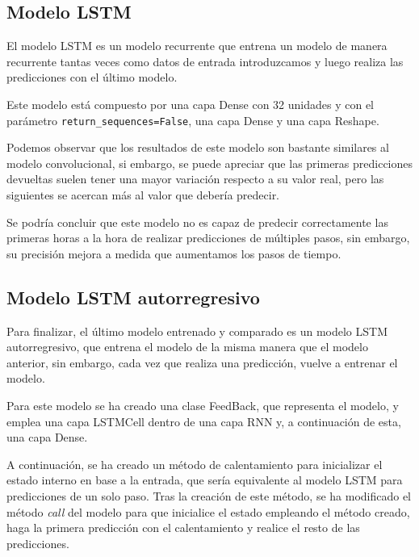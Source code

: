 
\subsection{Modelo LSTM}

El modelo LSTM es un modelo recurrente que entrena un modelo de manera recurrente tantas veces como datos de entrada introduzcamos y luego realiza las predicciones con el último modelo.

\par

Este modelo está compuesto por una capa Dense con 32 unidades y con el parámetro \texttt{return\_sequences=False}, una capa Dense y una capa Reshape.


Podemos observar que los resultados de este modelo son bastante similares al modelo convolucional, si embargo, se puede apreciar que las primeras predicciones devueltas suelen tener una mayor variación respecto a su valor real, pero las siguientes se acercan más al valor que debería predecir.


Se podría concluir que este modelo no es capaz de predecir correctamente las primeras horas a la hora de realizar predicciones de múltiples pasos, sin embargo, su precisión mejora a medida que aumentamos los pasos de tiempo.

\subsection{Modelo LSTM autorregresivo}

Para finalizar, el último modelo entrenado y comparado es un modelo LSTM autorregresivo, que entrena el modelo de la misma manera que el modelo anterior, sin embargo, cada vez que realiza una predicción, vuelve a entrenar el modelo.

\par

Para este modelo se ha creado una clase FeedBack, que representa el modelo, y emplea una capa LSTMCell dentro de una capa RNN y, a continuación de esta, una capa Dense.

\par

A continuación, se ha creado un método de calentamiento para inicializar el estado interno en base a la entrada, que sería equivalente al modelo LSTM para predicciones de un solo paso. Tras la creación de este método, se ha modificado el método \textit{call} del modelo para que inicialice el estado empleando el método creado, haga la primera predicción con el calentamiento y realice el resto de las predicciones.

